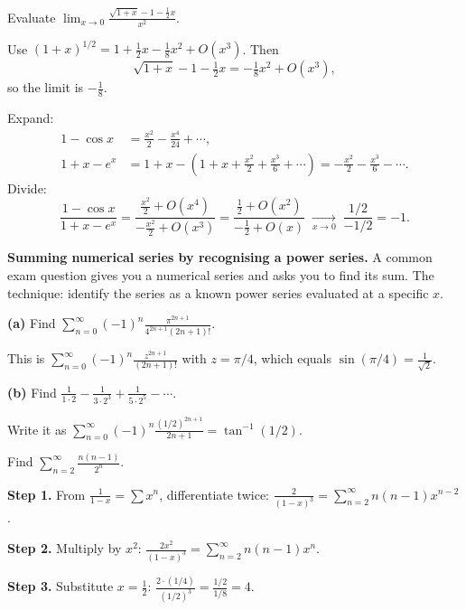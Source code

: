 \begin{examplebox}[title={Worked Example: binomial series limit (Tutorial~12, Q4(b))}]
Evaluate $\displaystyle\lim_{x\to 0}\frac{\sqrt{1+x}-1-\frac12 x}{x^2}$.

\smallskip
Use $(1+x)^{1/2}=1+\frac12 x-\frac18 x^2+O(x^3)$.
Then
\[
\sqrt{1+x}-1-\tfrac12 x=-\tfrac18 x^2+O(x^3),
\]
so the limit is $-\frac18$.
\end{examplebox}

\begin{examplebox}[title={Worked Example: $\lim_{x\to 0}\frac{1-\cos x}{1+x-e^x}$ (Lecture Ex.~6.21)}]
Expand:
\begin{align*}
1-\cos x &= \frac{x^2}{2}-\frac{x^4}{24}+\cdots,\\
1+x-e^x &= 1+x-\left(1+x+\frac{x^2}{2}+\frac{x^3}{6}+\cdots\right)
=-\frac{x^2}{2}-\frac{x^3}{6}-\cdots.
\end{align*}
Divide:
\[
\frac{1-\cos x}{1+x-e^x}
=\frac{\frac{x^2}{2}+O(x^4)}{-\frac{x^2}{2}+O(x^3)}
=\frac{\frac12+O(x^2)}{-\frac12+O(x)}
\;\xrightarrow[x\to 0]{}\;\frac{1/2}{-1/2}=-1.
\]
\end{examplebox}

\noindent\textbf{Summing numerical series by recognising a power series.}
A common exam question gives you a numerical series and asks you to find its sum.
The technique: identify the series as a known power series evaluated at a specific $x$.

\begin{examplebox}[title={Worked Example: summing via standard series (Tutorial~12, Q6)}]
\textbf{(a)} Find $\displaystyle\sum_{n=0}^{\infty}(-1)^n\frac{\pi^{2n+1}}{4^{2n+1}(2n+1)!}$.

This is $\sum_{n=0}^{\infty}(-1)^n\frac{z^{2n+1}}{(2n+1)!}$ with $z=\pi/4$, which equals $\sin(\pi/4)=\frac{1}{\sqrt{2}}$.

\smallskip
\textbf{(b)} Find $\displaystyle\frac{1}{1\cdot 2}-\frac{1}{3\cdot 2^3}+\frac{1}{5\cdot 2^5}-\cdots$.

Write it as $\sum_{n=0}^{\infty}(-1)^n\frac{(1/2)^{2n+1}}{2n+1}=\tan^{-1}(1/2)$.
\end{examplebox}

\begin{examplebox}[title={Worked Example: $\sum n(n-1)/2^n$ via generating function (Tutorial~11, Q6(b))}]
Find $\displaystyle\sum_{n=2}^{\infty}\frac{n(n-1)}{2^n}$.

\smallskip
\textbf{Step 1.} From $\frac{1}{1-x}=\sum x^n$, differentiate twice:
$\frac{2}{(1-x)^3}=\sum_{n=2}^{\infty}n(n-1)x^{n-2}$.

\textbf{Step 2.} Multiply by $x^2$:
$\frac{2x^2}{(1-x)^3}=\sum_{n=2}^{\infty}n(n-1)x^n$.

\textbf{Step 3.} Substitute $x=\frac12$:
$\frac{2\cdot(1/4)}{(1/2)^3}=\frac{1/2}{1/8}=4$.
\end{examplebox}

